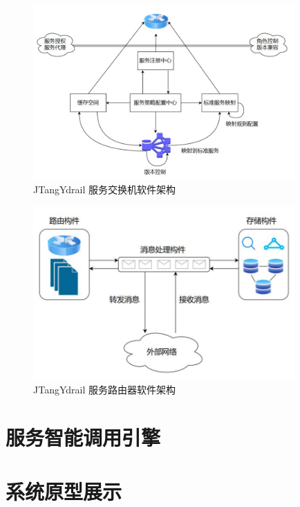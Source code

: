  \begin{figure}[htbp]
    \centering
    \includegraphics[width=10cm]{./images/switchboard.png}
    \caption{JTangYdrail 服务交换机软件架构}
    \label{fig:jianmu}
  \end{figure}

  \begin{figure}[htbp]
    \centering
    \includegraphics[width=10cm]{./images/router.png}
    \caption{JTangYdrail 服务路由器软件架构}
    \label{fig:jianmu}
  \end{figure}


  
  
  \section{服务智能调用引擎}

  \section{系统原型展示}
